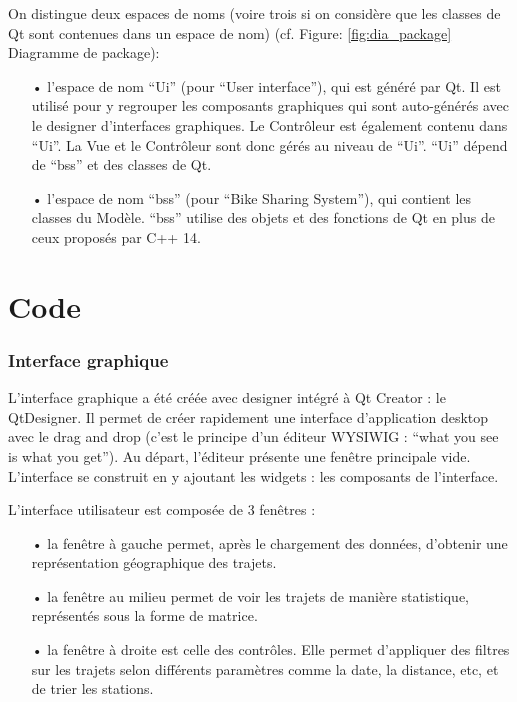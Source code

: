 \documentclass[12pt]{article}
\begin{document}
		On distingue deux espaces de noms (voire trois si on considère que les classes de
		Qt sont contenues dans un espace de nom) (cf. Figure: \ref{fig:dia_package} Diagramme de
		package):\\
	
		\begin{itemize}
		\item[•] l’espace de nom “Ui” (pour “User interface”), qui est généré par Qt.
		Il est utilisé pour y regrouper les composants graphiques qui sont auto-générés avec
		le designer d’interfaces graphiques. Le Contrôleur est également contenu dans “Ui”.
		La Vue et le Contrôleur sont donc gérés au niveau de “Ui”. “Ui” dépend de “bss” et des
		classes de Qt.\\
		
		\item[•]l’espace de nom “bss” (pour “Bike Sharing System”), qui contient les classes
		du Modèle. “bss” utilise des objets et des fonctions de Qt en plus de ceux proposés
		par C++ 14.
		\end{itemize}

\newpage
\part{Code}
	\section{Interface graphique}
	L’interface graphique a été créée avec designer intégré à Qt Creator : le QtDesigner. Il permet de créer rapidement une interface d’application desktop avec le drag and drop (c’est le principe d’un éditeur WYSIWIG : “what you see is what you get”). Au départ, l’éditeur présente une fenêtre principale vide. L’interface se construit en y ajoutant les widgets : les composants de l’interface.

	L’interface utilisateur est composée de 3 fenêtres :\\
	\begin{itemize}
	\item[•] la fenêtre à gauche permet, après le chargement des données, d’obtenir une représentation géographique des trajets.
	\item[•] la fenêtre au milieu permet de voir les trajets de manière statistique, représentés sous la forme de matrice.
	\item[•] la fenêtre à droite est celle des contrôles. Elle permet d’appliquer des filtres sur les trajets selon différents paramètres comme la date, la distance, etc, et de trier les stations.
	\end{itemize}
	
\end{document}
